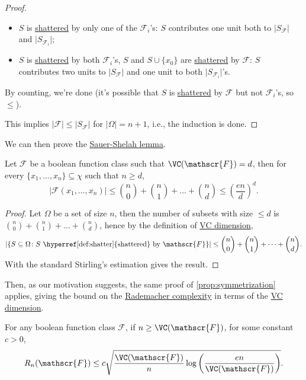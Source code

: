 \begin{proof}
\begin{explanation}
\begin{itemize}
			\item \(S\) is \hyperref[def:shatter]{shattered} by only one of the \(\mathscr{F} _i\)'s: \(S\) contributes one unit both to \(\vert S_{\mathscr{F} } \vert \) and \(\vert S_{\mathscr{F} _i} \vert \);
			\item \(S\) is \hyperref[def:shatter]{shattered} by both \(\mathscr{F} _i\)'s, \(S\) and \(S \cup \{ x_0 \} \) are \hyperref[def:shatter]{shattered} by \(\mathscr{F} \): \(S\) contributes two units to \(\vert S_{\mathscr{F} } \vert \) and one unit to both \(\vert S_{\mathscr{F} _i} \vert \)'s.
		\end{itemize}
		By counting, we're done (it's possible that \(S\) is \hyperref[def:shatter]{shattered} by \(\mathscr{F} \) but not \(\mathscr{F} _i\)'s, so \(\leq \)).
	\end{explanation}

	This implies \(\vert \mathscr{F} \vert \leq \vert S_{\mathscr{F} } \vert \) for \(\vert \Omega \vert = n+1\), i.e., the induction is done.
\end{proof}

We can then prove the \hyperref[lma:Sauer-Shelah]{Sauer-Shelah lemma}.

\begin{lemma}\label{lma:Sauer-Shelah}
	Let \(\mathscr{F} \) be a boolean function class such that \(\VC(\mathscr{F}) = d\), then for every \(\{ x_1, \dots , x_n \} \subseteq \chi \) such that \(n \geq d\),
	\[
		\vert \mathscr{F} (x_1, \dots , x_n) \vert
		\leq \binom{n}{0} + \binom{n}{1} + \dots + \binom{n}{d}
		\leq \left( \frac{en}{d} \right) ^d.
	\]
\end{lemma}
\begin{proof}
	Let \(\Omega \) be a set of size \(n\), then the number of subsets with size \(\leq d\) is \(\binom{n}{0} + \binom{n}{1} + \dots + \binom{n}{d}\), hence by the definition of \hyperref[def:VC-dimension]{VC dimension},
	\[
		\vert \{ S \subseteq \Omega \colon S \text{ \hyperref[def:shatter]{shattered} by } \mathscr{F} \} \vert
		\leq \binom{n}{0} + \binom{n}{1} + \dots + \binom{n}{d}.
	\]
	With the standard Stirling's estimation gives the result.
\end{proof}

Then, as our motivation suggests, the same proof of \autoref{prop:symmetrization} applies, giving the bound on the \hyperref[def:Rademacher-complexity]{Rademacher complexity} in terms of the \hyperref[def:VC-dimension]{VC dimension}.

\begin{proposition}\label{prop:lec9}
	For any boolean function class \(\mathscr{F} \), if \(n \geq \VC(\mathscr{F} ) \), for some constant \(c > 0\),
	\[
		R_n(\mathscr{F} ) \leq c \sqrt{\frac{\VC(\mathscr{F} ) }{n} \log \left( \frac{en}{\VC(\mathscr{F} ) } \right) }.
	\]
\end{proposition}

